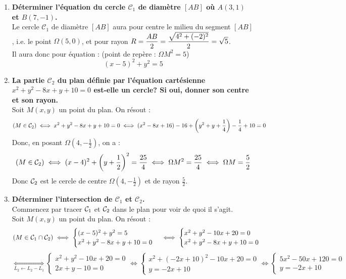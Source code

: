 \documentclass[a4paper, 11pt]{article}
\begin{document}
\begin{correction}  \;
	\begin{enumerate}
		\item \textbf{D\'eterminer l'\'equation du cercle $\mathcal{C}_1$ de diam\`etre $[AB]$ o\`u $A(3,1)$ et $B(7,-1)$.}\\
		      Le cercle $\mathcal{C}_1$ de diam\`etre $[AB]$ aura pour centre le milieu du segment $[AB]$, i.e. le point $\Omega(5,0)$, et pour rayon $R=\displaystyle\frac{AB}{2}=\frac{\sqrt{4^2+(-2)^2}}{2}=\sqrt{5}$.\\
		      Il aura donc pour \'equation : (point de rep\`ere : $\Omega M^2 = 5$)
		      $$ \boxed{(x-5)^2+y^2=5} $$
		\item \textbf{La partie $\mathcal{C}_2$ du plan d\'efinie par l'\'equation cart\'esienne $x^2+y^2-8x+y+10=0$ est-elle un cercle? Si oui, donner son centre et son rayon.}\\
		      Soit $M(x,y)$ un point du plan. On r\'esout :
		      $$ \left( M \in {\cal C}_2 \right) \iff x^2+y^2-8x+y+10=0 \iff (x^2-8x+16)-16+\left(y^2+y+\frac{1}{4}\right)-\frac{1}{4}+10 = 0 $$
		      Donc, en posant $\Omega\left(4,-\frac{1}{2}\right)$, on a :
		      $$ \left( M \in {\cal C}_2 \right) \iff (x-4)^2+\left(y+\frac{1}{2}\right)^2=\frac{25}{4} \iff \Omega M^2 = \frac{25}{4} \iff \Omega M = \frac{5}{2} $$
		      Donc ${\cal C}_2$ est le cercle de centre $\Omega\left(4,-\frac{1}{2}\right)$ et de rayon $ \frac{5}{2}$.
		\item \textbf{D\'eterminer l'intersection de $\mathcal{C}_1$ et $\mathcal{C}_2$.}\\
		      Commencez par tracer ${\cal C}_1$ et ${\cal C}_2$ dans le plan pour voir de quoi il s'agit.\\
		      Soit $M(x,y)$ un point du plan. On r\'esout :
		      $$ \left( M \in {\cal C}_1 \cap {\cal C}_2 \right) \iff \begin{cases} (x-5)^2+y^2=5 \\ x^2+y^2-8x+y+10=0 \end{cases} \iff \begin{cases} x^2+y^2-10x+20=0 \\ x^2+y^2-8x+y+10=0 \end{cases} $$
		      $$ \underset{L_2 \leftarrow L_2-L_1}{\iff} \begin{cases} x^2+y^2-10x+20=0 \\ 2x+y-10=0 \end{cases} \iff \begin{cases} x^2+(-2x+10)^2-10x+20=0 \\ y=-2x+10 \end{cases} \iff \begin{cases} 5x^2-50x+120=0 \\ y=-2x+10 \end{cases} $$

\end{enumerate}
\end{correction}
\end{document}
